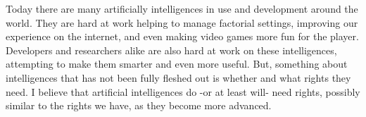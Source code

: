 Today there are many artificially intelligences in use and development around the world. They are hard at work helping to manage factorial settings, improving our experience on the internet, and even making video games more fun for the player. Developers and researchers alike are also hard at work on these intelligences, attempting to make them smarter and even more useful. But, something about intelligences that has not been fully fleshed out is whether and what rights they need. I believe that artificial intelligences do -or at least will- need rights, possibly similar to the rights we have, as they become more advanced.